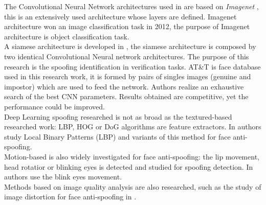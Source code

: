 The Convolutional Neural Network architectures used in \cite{yangLL14,LSTM-CNN} are based on \textit{Imagenet} \cite{imagenet}, this is an extensively used architecture whose layers are defined. Imagenet architecture won an image classification task in 2012, the purpose of Imagenet architecture is object classification task.\\

A siamese architecture is developed in \cite{Verification}, the siamese architecture is composed by two identical Convolutional Neural network architectures. The purpose of this research is the spoofing identification in verification tasks. AT\&T is face database used in this research work, it is formed by pairs of singles images (genuine and impostor) which are used to feed the network.  Authors realize an exhaustive search of the best CNN parameters. Results obtained are competitive, yet the performance could be improved.\\

Deep Learning spoofing researched is not as broad as the textured-based researched work: LBP, HOG or DoG algorithms are feature extractors. In \cite{LBP_FaceAnti} authors study Local Binary Patterns (LBP) and variants of this method for face anti-spoofing.\\

Motion-based is also widely investigated for face anti-spoofing: the lip movement, head rotatior or blinking eyes is detected and studied for spoofing detection. In \cite{Blink_antispoofing} authors use the blink eyes movement.\\

Methods based on image quality analysis are also researched, such as the study of image distortion for face anti-spoofing in \cite{MSUdatabse}.






